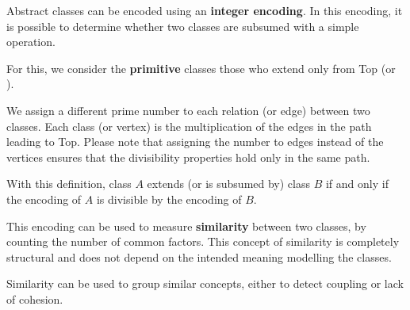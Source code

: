 Abstract classes can be encoded using an \textbf{integer encoding}.
In this encoding, it is possible to determine whether two classes are subsumed with a simple operation.

For this, we consider the \textbf{primitive} classes those who extend only from Top (or ).

We assign a different prime number to each relation (or edge) between two classes.
Each class (or vertex) is the multiplication of the edges in the path leading to Top.
Please note that assigning the number to edges instead of the vertices ensures that the divisibility properties hold only in the same path.

With this definition, class $A$ extends (or is subsumed by) class $B$ if and only if the encoding of $A$ is divisible by the encoding of $B$.

This encoding can be used to measure \textbf{similarity} between two classes, by counting the number of common factors.
This concept of similarity is completely structural and does not depend on the intended meaning modelling the classes.

Similarity can be used to group similar concepts, either to detect coupling or lack of cohesion.

